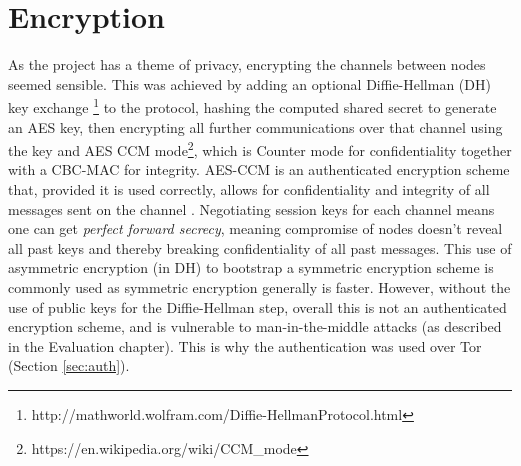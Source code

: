 \documentclass[diss.tex]{subfiles}
\begin{document}
\section{Encryption}
As the project has a theme of privacy, encrypting the channels between nodes seemed sensible. This was achieved by adding an optional Diffie-Hellman (DH) key exchange \footnote{http://mathworld.wolfram.com/Diffie-HellmanProtocol.html} to the protocol, hashing the computed shared secret to generate an AES key, then encrypting all further communications over that channel using the key and AES CCM mode\footnote{https://en.wikipedia.org/wiki/CCM\_mode}, which is Counter mode for confidentiality together with a CBC-MAC for integrity. AES-CCM is an authenticated encryption scheme that, provided it is used correctly, allows for confidentiality and integrity of all messages sent on the channel \cite{ccm}. Negotiating session keys for each channel means one can get \textit{perfect forward secrecy}, meaning compromise of nodes doesn't reveal all past keys and thereby breaking confidentiality of all past messages. This use of asymmetric encryption (in DH) to bootstrap a symmetric encryption scheme is commonly used as symmetric encryption generally is faster. However, without the use of public keys for the Diffie-Hellman step, overall this is not an authenticated encryption scheme, and is vulnerable to man-in-the-middle attacks (as described in the Evaluation chapter). This is why the authentication was used over Tor (Section \ref{sec:auth}).
\end{document}
